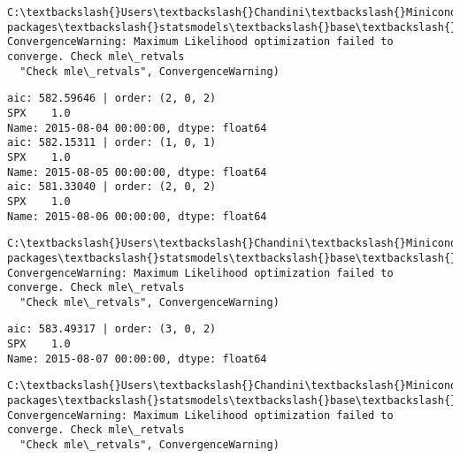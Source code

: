 \documentclass[11pt]{article}
\begin{document}
    \begin{Verbatim}[commandchars=\\\{\}]
C:\textbackslash{}Users\textbackslash{}Chandini\textbackslash{}Miniconda3\textbackslash{}envs\textbackslash{}auquan\textbackslash{}lib\textbackslash{}site-packages\textbackslash{}statsmodels\textbackslash{}base\textbackslash{}model.py:496: ConvergenceWarning: Maximum Likelihood optimization failed to converge. Check mle\_retvals
  "Check mle\_retvals", ConvergenceWarning)

    \end{Verbatim}

    \begin{Verbatim}[commandchars=\\\{\}]
aic: 582.59646 | order: (2, 0, 2)
SPX    1.0
Name: 2015-08-04 00:00:00, dtype: float64
aic: 582.15311 | order: (1, 0, 1)
SPX    1.0
Name: 2015-08-05 00:00:00, dtype: float64
aic: 581.33040 | order: (2, 0, 2)
SPX    1.0
Name: 2015-08-06 00:00:00, dtype: float64

    \end{Verbatim}

    \begin{Verbatim}[commandchars=\\\{\}]
C:\textbackslash{}Users\textbackslash{}Chandini\textbackslash{}Miniconda3\textbackslash{}envs\textbackslash{}auquan\textbackslash{}lib\textbackslash{}site-packages\textbackslash{}statsmodels\textbackslash{}base\textbackslash{}model.py:496: ConvergenceWarning: Maximum Likelihood optimization failed to converge. Check mle\_retvals
  "Check mle\_retvals", ConvergenceWarning)

    \end{Verbatim}

    \begin{Verbatim}[commandchars=\\\{\}]
aic: 583.49317 | order: (3, 0, 2)
SPX    1.0
Name: 2015-08-07 00:00:00, dtype: float64

    \end{Verbatim}

    \begin{Verbatim}[commandchars=\\\{\}]
C:\textbackslash{}Users\textbackslash{}Chandini\textbackslash{}Miniconda3\textbackslash{}envs\textbackslash{}auquan\textbackslash{}lib\textbackslash{}site-packages\textbackslash{}statsmodels\textbackslash{}base\textbackslash{}model.py:496: ConvergenceWarning: Maximum Likelihood optimization failed to converge. Check mle\_retvals
  "Check mle\_retvals", ConvergenceWarning)

    \end{Verbatim}
\end{document}
